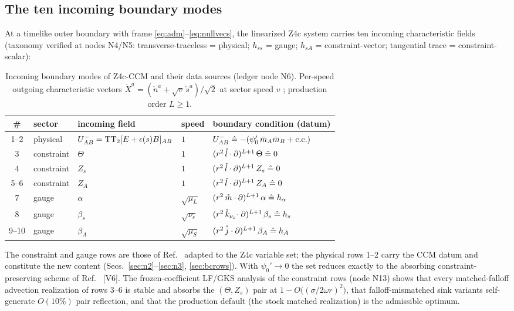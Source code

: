 \subsection{The ten incoming boundary modes}
\label{sec:modes}

At a timelike outer boundary with frame
\eqref{eq:adm}--\eqref{eq:nullvecs}, the linearized Z4c system carries
ten incoming characteristic fields (taxonomy verified at nodes N4/N5:
transverse-traceless = physical; $h_{ss}$ = gauge; $h_{sA}$ =
constraint-vector; tangential trace = constraint-scalar):
\begin{table}[htbp]
\centering
\caption{Incoming boundary modes of Z4c-CCM and their data sources
(ledger node N6). Per-speed outgoing characteristic vectors
$\mathring X^a = (\mathring n^a + \sqrt{v}\,\mathring s^a)/\sqrt2$ at
sector speed $v$ \cite{Ruiz:2010qj}; production order $L \ge 1$.}
\label{tab:modes}
\footnotesize
\begin{tabular}{cllll}
\hline\hline
\# & sector & incoming field & speed & boundary condition (datum) \\
\hline
1--2 & physical & $U^-_{AB} = {\rm TT}_2[E+\epsilon(s)B]_{AB}$ & $1$ &
 $U^-_{AB} \mathrel{\hat=} -(\psi_0'\,\bar m_A\bar m_B + {\rm c.c.})$
 \;[CCM: $\psi_0' = A^2\psi_0^{\rm CCE}$] \\
3 & constraint & $\Theta$ & $1$ &
 $(r^2\,\mathring l\cdot\partial)^{L+1}\,\Theta \mathrel{\hat=} 0$ \\
4 & constraint & $Z_s$ & $1$ &
 $(r^2\,\mathring l\cdot\partial)^{L+1}\,Z_s \mathrel{\hat=} 0$ \\
5--6 & constraint & $Z_A$ & $1$ &
 $(r^2\,\mathring l\cdot\partial)^{L+1}\,Z_A \mathrel{\hat=} 0$ \\
7 & gauge & $\alpha$ & $\sqrt{\mu_L}$ &
 $(r^2\,\mathring m\cdot\partial)^{L+1}\,\alpha \mathrel{\hat=} h_\alpha$ \\
8 & gauge & $\beta_s$ & $\sqrt{\nu_s}$ &
 $(r^2\,\mathring k_{\nu_s}\!\cdot\partial)^{L+1}\,\beta_s \mathrel{\hat=} h_s$ \\
9--10 & gauge & $\beta_A$ & $\sqrt{\mu_S}$ &
 $(r^2\,\mathring j\cdot\partial)^{L+1}\,\beta_A \mathrel{\hat=} h_A$ \\
\hline\hline
\end{tabular}
\end{table}
The constraint and gauge rows are those of Ref.~\cite{Ruiz:2010qj}
adapted to the Z4c variable set; the physical rows 1--2 carry the CCM
datum and constitute the new content (Secs.~\ref{sec:n2}--\ref{sec:n3},
\ref{sec:bcrows}). With $\psi_0'\to0$ the set reduces exactly to the
absorbing constraint-preserving scheme of Ref.~\cite{Ruiz:2010qj} [V6].
The frozen-coefficient LF/GKS analysis of the constraint rows (node N13)
shows that every matched-falloff advection realization of rows 3--6 is
stable and absorbs the $(\Theta,Z_s)$ pair at
$1-O\big((\sigma/2\omega r)^2\big)$, that falloff-mismatched sink
variants self-generate $O(10\%)$ pair reflection, and that the production
default (the stock matched realization) is the admissible optimum.

